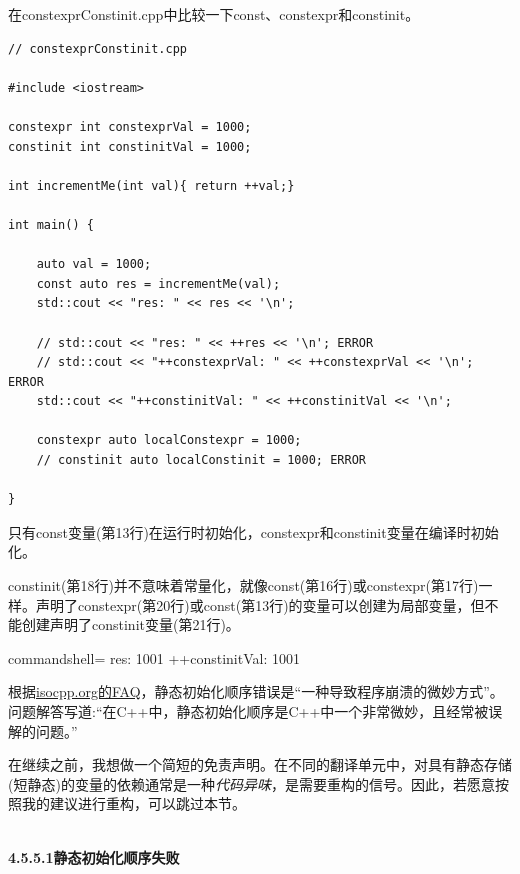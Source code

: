 
在constexprConstinit.cpp中比较一下const、constexpr和constinit。

\begin{lstlisting}[style=styleCXX]
// constexprConstinit.cpp

#include <iostream>

constexpr int constexprVal = 1000;
constinit int constinitVal = 1000;

int incrementMe(int val){ return ++val;}

int main() {
	
	auto val = 1000;
	const auto res = incrementMe(val);
	std::cout << "res: " << res << '\n';
	
	// std::cout << "res: " << ++res << '\n'; ERROR
	// std::cout << "++constexprVal: " << ++constexprVal << '\n'; ERROR
	std::cout << "++constinitVal: " << ++constinitVal << '\n';
	
	constexpr auto localConstexpr = 1000;
	// constinit auto localConstinit = 1000; ERROR

}
\end{lstlisting}

只有const变量(第13行)在运行时初始化，constexpr和constinit变量在编译时初始化。

constinit(第18行)并不意味着常量化，就像const(第16行)或constexpr(第17行)一样。声明了constexpr(第20行)或const(第13行)的变量可以创建为局部变量，但不能创建声明了constinit变量(第21行)。

\begin{tcblisting}{commandshell={}}
res: 1001
++constinitVal: 1001
\end{tcblisting}


根据\href{https://isocpp.org/wiki/faq/ctors#static-init-order}{isocpp.org的FAQ}，静态初始化顺序错误是“一种导致程序崩溃的微妙方式”。问题解答写道:“在C++中，静态初始化顺序是C++中一个非常微妙，且经常被误解的问题。”

在继续之前，我想做一个简短的免责声明。在不同的翻译单元中，对具有静态存储(短静态)的变量的依赖通常是一种\textit{代码异味}，是需要重构的信号。因此，若愿意按照我的建议进行重构，可以跳过本节。

\hspace*{\fill} \\ %
\noindent
\textbf{4.5.5.1\hspace{0.2cm}静态初始化顺序失败}

